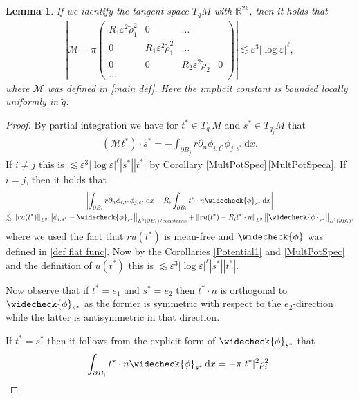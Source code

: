 \documentclass[10pt]{amsart}
\let\epsilon\varepsilon
\newcommand{\constants}{\textup{constants}}
\newtheorem{lemma}[theorem]{Lemma}
\theoremstyle{definition}
\newcommand\R{\mathbb{R}}
\newcommand\norm[1]{\left\lVert #1\right\rVert}
\newcommand\bnorm[1]{\bigl\lVert #1\bigr\rVert}
\newcommand\eq{=}
\newcommand\dd{\,\mathrm{d}}
\newcommand\dx{\dd x}
\let\chek\widecheck
\let\de\partial
\let\eps\epsilon
\begin{document}
\begin{lemma}\label{conv Inertia}
If we identify the tangent space $T_qM$ with $\R^{2k}$, then it holds that
\begin{align*}
\left|\mathcal{M}-\pi\begin{pmatrix}R_1\eps^2\tilde{\rho}_1^2 &0 &\dots\\0& R_1\eps^2\tilde{\rho}_1^2& \dots\\0& 0 & R_2\eps^2\tilde{\rho}_2 &0\\
\dots\end{pmatrix}\right|\lesssim \eps^3|{\log\eps}|^\ell,
\end{align*}
where $\mathcal{M}$ was defined in \ref{main def}.
Here the implicit constant is bounded locally uniformly in $\tilde{q}$.
\end{lemma}
\begin{proof}
By partial integration we have for $t^*\in T_{q_i}M$ and $s^*\in T_{q_j}M$ that
\begin{align*}
(\mathcal{M}t^*)\cdot s^*\eq-\int_{\de B_j}r \de_n\phi_{i,t^*}\phi_{j,s^*}\dx.
\end{align*}
If $i\neq j$ this is $\lesssim \eps^3|{\log\eps}|^\ell|s^*||t^*|$ by Corollary \ref{MultPotSpec}\,\eqref{MultPotSpeca}. If~$i=j$, then it holds that
\begin{multline*}
\left|\int_{\de B_i} r\de_n\phi_{i,t^*}\phi_{j,s^*}\dx-R_i\int_{\de B_i}t^*\cdot n\chek{\phi}_{s^*}\dx\right|\\
\lesssim \norm{ru(t^*)}_{L^2}\bnorm{\phi_{i,s^*}-\chek{\phi}_{s^*}}_{L^2(\de B_i)/\constants}+\norm{ru(t^*)-R_it^*\cdot n}_{L^2}\bnorm{\chek{\phi}_{s^*}}_{L^2(\de B_i)},
\end{multline*}
where we used the fact that $ru(t^*)$ is mean-free and $\chek{\phi}$ was defined in \ref{def flat func}. Now by the Corollaries \ref{Potential1} and \ref{MultPotSpec} and the definition of $u(t^*)$ this is $\lesssim \eps^3|{\log\eps}|^\ell|s^*||t^*|$.

Now observe that if $t^*=e_1$ and $s^*=e_2$ then $t^*\cdot n$ is orthogonal to $\chek{\phi}_{s^*}$ as the former is symmetric with respect to the $e_2$-direction while the latter is antisymmetric in that direction.

If $t^*=s^*$ then it follows from the explicit form of $\chek{\phi}_{s^*}$ that
\[
\int_{\de B_i}t^*\cdot n\chek{\phi}_{s^*}\dx\eq -\pi|t^*|^2\rho_i^2.\qedhere
\]
\end{proof}
\end{document}
